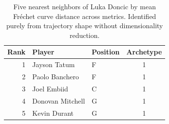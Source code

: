\begin{table}[htbp]
  \centering\small
  \begin{tabular}{rllc}
    \toprule
    Rank & Player & Position & Archetype \\
    \midrule
    1 & Jayson Tatum & F & 1 \\
    2 & Paolo Banchero & F & 1 \\
    3 & Joel Embiid & C & 1 \\
    4 & Donovan Mitchell & G & 1 \\
    5 & Kevin Durant & G & 1 \\
    \bottomrule
  \end{tabular}
  \caption{Five nearest neighbors of Luka Doncic by mean Fr\'{e}chet curve distance across metrics. Identified purely from trajectory shape without dimensionality reduction.}
  \label{tab:Luka_Doncic_frechet_curve_neighbors}
\end{table}

